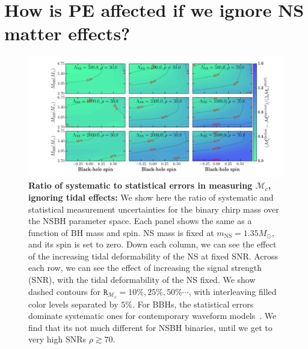 \documentclass[aps,prd,amsmath,floats,floatfix, twocolumn,
superscriptaddress,nofootinbib,showpacs]{revtex4-1}
\newcommand{\mns}{m_\mathrm{NS}}
\newcommand{\mchirp}{\mathcal{M}_c}
\newcommand{\arr}{\mathtt{R}}
\begin{document}
\section{How is PE affected if we ignore NS matter effects?}\label{s1:PEwithnoNS}
% 
\begin{figure}
\centering 
\includegraphics[trim=20 20 18 22 0,clip=true,width=1.95\columnwidth]{TNMchirpBiasesOverCIWidths_CI90_0_Lambda_SNR30_70_linear}
\caption{{\bf Ratio of systematic to statistical errors in measuring $\mchirp$, ignoring tidal effects:}
We show here the ratio of systematic and statistical
measurement uncertainties for the binary chirp mass over the NSBH parameter 
space. Each panel shows the same as a function of BH mass and spin. NS mass
is fixed at $\mns=1.35M_\odot$, and its spin is set to zero. Down each column,
we can see the effect of the increasing tidal deformability of the NS at fixed
SNR. Across each row, we can see the effect of increasing the signal strength
(SNR), with the tidal deformability of the NS fixed. We show dashed contours
for $\arr_{\mchirp}=10\%, 25\%, 50\%\cdots$, with interleaving filled color
levels separated by $5\%$.
% 
For BBHs, the statistical errors dominate systematic ones for contemporary
waveform models~\cite{Inprerp-LVC-WaveModels:2016,Kumar:2016dhh}. We find that
its not much different for NSBH binaries, until we get to very high SNRs
$\rho\gtrsim 70$.
}
\label{fig:TN_chirpMassBias_vs_Lambda_SNR}
\end{figure}
%
\end{document}
